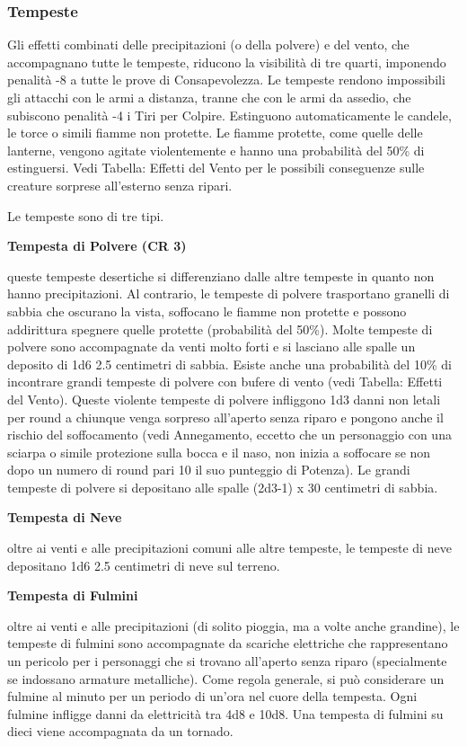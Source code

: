 \documentclass[a4paper,11pt,twoside,openany]{book}
\begin{document}
\subsubsection{Tempeste}

\label{tempeste}

Gli effetti combinati delle precipitazioni (o della polvere) e del vento, che accompagnano tutte le tempeste, riducono la visibilità di tre quarti, imponendo penalità -8 a tutte le prove di Consapevolezza. Le tempeste rendono impossibili gli attacchi con le armi a distanza, tranne che con le armi da assedio, che subiscono penalità -4 i Tiri per Colpire.
Estinguono automaticamente le candele, le torce o simili fiamme non protette. Le fiamme protette, come quelle delle lanterne, vengono agitate violentemente e hanno una probabilità del 50\% di estinguersi. Vedi Tabella: Effetti del Vento per le possibili conseguenze sulle creature sorprese all'esterno senza ripari.

Le tempeste sono di tre tipi.

\textbf{Tempesta di Polvere (CR 3)}

queste tempeste desertiche si differenziano dalle altre tempeste in quanto non hanno precipitazioni. Al contrario, le tempeste di polvere trasportano granelli di sabbia che oscurano la vista, soffocano le fiamme non protette e possono addirittura spegnere quelle protette (probabilità del 50\%). Molte tempeste di polvere sono accompagnate da venti molto forti e si lasciano alle spalle un deposito di 1d6 \texttimes{} 2.5 centimetri di sabbia.
Esiste anche una probabilità del 10\% di incontrare grandi tempeste di polvere con bufere di vento (vedi Tabella: Effetti del Vento). Queste violente tempeste di polvere infliggono 1d3 danni non letali per round a chiunque venga sorpreso all'aperto senza riparo e pongono anche il rischio del soffocamento (vedi Annegamento, eccetto che un personaggio con una sciarpa o simile protezione sulla bocca e il naso, non inizia a soffocare se non dopo un numero di round pari 10 \texttimes{} il suo punteggio di Potenza). Le grandi tempeste di polvere si depositano alle spalle (2d3-1) x 30 centimetri di sabbia.

\textbf{Tempesta di Neve}

oltre ai venti e alle precipitazioni comuni alle altre tempeste, le tempeste di neve depositano 1d6 \texttimes{} 2.5 centimetri di neve sul terreno.

\textbf{Tempesta di Fulmini}

oltre ai venti e alle precipitazioni (di solito pioggia, ma a volte anche grandine), le tempeste di fulmini sono accompagnate da scariche elettriche che rappresentano un pericolo per i personaggi che si trovano all'aperto senza riparo (specialmente se indossano armature metalliche). Come regola generale, si può considerare un fulmine al minuto per un periodo di un'ora nel cuore della tempesta. Ogni fulmine infligge danni da elettricità tra 4d8 e 10d8. Una tempesta di fulmini su dieci viene accompagnata da un tornado.
\end{document}
